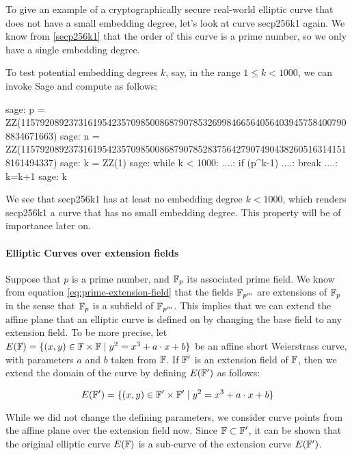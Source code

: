\begin{example}
\label{ex:pairings_on_secp256k1}
 To give an example of a cryptographically secure real-world elliptic curve that does not have a small embedding degree, let's look at curve secp256k1 again. We know from \ref{secp256k1} that the order of this curve is a prime number, so we only have a single embedding degree.

To test potential embedding degrees $k$, say, in the range $1\leq k < 1000$, we can invoke Sage and compute as follows:
\begin{sagecommandline}
sage: p = ZZ(115792089237316195423570985008687907853269984665640564039457584007908834671663)
sage: n = ZZ(115792089237316195423570985008687907852837564279074904382605163141518161494337)
sage: k = ZZ(1)
sage: while k < 1000:
....:     if (p^k-1)%
....:         break
....:     k=k+1
sage: k
\end{sagecommandline}
We see that secp256k1 has at least no embedding degree $k<1000$, which renders secp256k1 a curve that has no small embedding degree. This property will be of importance later on.
\end{example}

\paragraph{Elliptic Curves over extension fields} Suppose that $p$ is a prime number, and $\mathbb{F}_p$ its associated prime field. We know from equation \ref{eq:prime-extension-field} that the fields $\mathbb{F}_{p^m}$ are extensions of $\mathbb{F}_p$ in the sense that $\mathbb{F}_{p}$ is a subfield of $\mathbb{F}_{p^m}$. This implies that we can extend the affine plane that an elliptic curve is defined on by changing the base field to any extension field. To be more precise, let 
$E(\mathbb{F})=\{ (x,y)\in \mathbb{F} \times \mathbb{F} \;|\; y^2 = x^3 +a\cdot x +b \}$ be an affine short Weierstrass curve, with parameters $a$ and $b$ taken from $\mathbb{F}$. If $\mathbb{F}'$ is an extension field of $\mathbb{F}$, then we extend the domain of the curve by defining $E(\mathbb{F}')$ as follows:

\begin{equation}\label{elliptic-curve-extension}
E(\mathbb{F}')=\{ (x,y)\in \mathbb{F}' \times \mathbb{F}' \;|\; y^2 = x^3 +a\cdot x +b \}
\end{equation}   

While we did not change the defining parameters, we consider curve points from the affine plane over the extension field now. Since $\mathbb{F}\subset \mathbb{F}'$, it can be shown that the original elliptic curve $E(\mathbb{F})$ is a sub-curve of the extension curve $E(\mathbb{F}')$.

